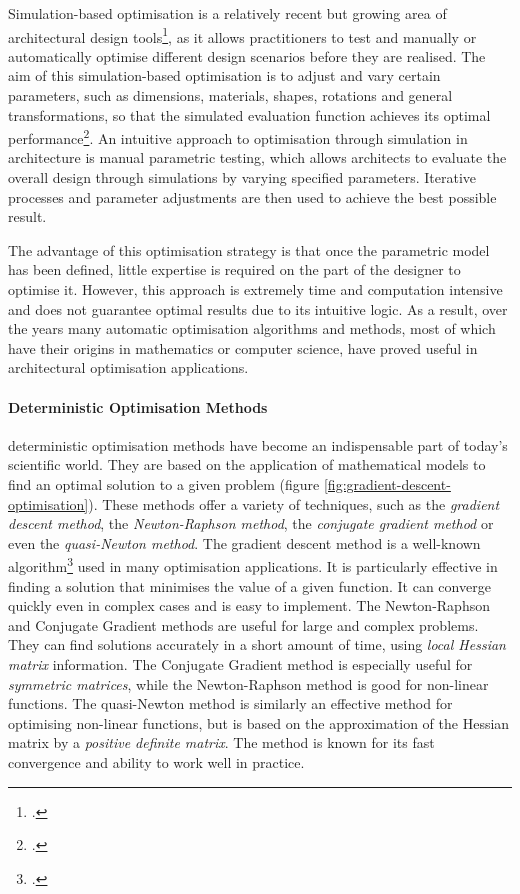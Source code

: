 \documentclass[a4paper, 12pt]{report}
\begin{document}
Simulation-based optimisation is a relatively recent but growing area of architectural design tools\footcite{sebestyen2020machine}, as it allows practitioners to test and manually or automatically optimise different design scenarios before they are realised. The aim of this simulation-based optimisation is to adjust and vary certain parameters, such as dimensions, materials, shapes, rotations and general transformations, so that the simulated evaluation function achieves its optimal performance\footcite{aksin2021use}. An intuitive approach to optimisation through simulation in architecture is manual parametric testing, which allows architects to evaluate the overall design through simulations by varying specified parameters. Iterative processes and parameter adjustments are then used to achieve the best possible result.

The advantage of this optimisation strategy is that once the parametric model has been defined, little expertise is required on the part of the designer to optimise it. However, this approach is extremely time and computation intensive and does not guarantee optimal results due to its intuitive logic. As a result, over the years many automatic optimisation algorithms and methods, most of which have their origins in mathematics or computer science, have proved useful in architectural optimisation applications.

\paragraph{Deterministic Optimisation Methods}\label{par:deterministic-optimisation-methods}

\Gls{deterministic} optimisation methods have become an indispensable part of today's scientific world. They are based on the application of mathematical models to find an optimal solution to a given problem (figure \ref{fig:gradient-descent-optimisation}). These methods offer a variety of techniques, such as the \textit{gradient descent method}, the \textit{Newton-Raphson method}, the \textit{conjugate gradient method} or even the \textit{quasi-Newton method}. The gradient descent method is a well-known algorithm\footcite{zhang2021dive} used in many optimisation applications. It is particularly effective in finding a solution that minimises the value of a given function. It can converge quickly even in complex cases and is easy to implement. The Newton-Raphson and Conjugate Gradient methods are useful for large and complex problems. They can find solutions accurately in a short amount of time, using \textit{local Hessian matrix} information. The Conjugate Gradient method is especially useful for \textit{symmetric matrices}, while the Newton-Raphson method is good for non-linear functions. The quasi-Newton method is similarly an effective method for optimising non-linear functions, but is based on the approximation of the Hessian matrix by a \textit{positive definite matrix}. The method is known for its fast convergence and ability to work well in practice.
\end{document}
